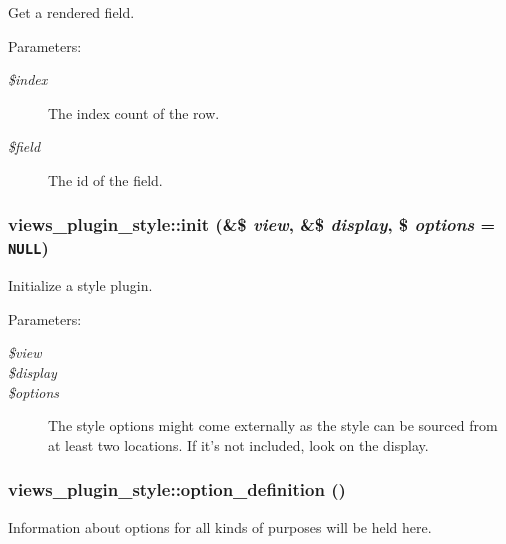Get a rendered field.

\begin{Desc}
\item[Parameters:]
\begin{description}
\item[{\em \$index}]The index count of the row. \item[{\em \$field}]The id of the field. \end{description}
\end{Desc}
\hypertarget{classviews__plugin__style_b48326b2ea3d9bd9ad5fdf4f544c8eed}{
\subsubsection[{init}]{\setlength{\rightskip}{0pt plus 5cm}views\_\-plugin\_\-style::init (\&\$ {\em view}, \/  \&\$ {\em display}, \/  \$ {\em options} = {\tt NULL})}}
\label{classviews__plugin__style_b48326b2ea3d9bd9ad5fdf4f544c8eed}


Initialize a style plugin.

\begin{Desc}
\item[Parameters:]
\begin{description}
\item[{\em \$view}]\item[{\em \$display}]\item[{\em \$options}]The style options might come externally as the style can be sourced from at least two locations. If it's not included, look on the display. \end{description}
\end{Desc}
\hypertarget{classviews__plugin__style_95b6f2eadf403ff36f1ff2860294b3c2}{
\subsubsection[{option\_\-definition}]{\setlength{\rightskip}{0pt plus 5cm}views\_\-plugin\_\-style::option\_\-definition ()}}
\label{classviews__plugin__style_95b6f2eadf403ff36f1ff2860294b3c2}


Information about options for all kinds of purposes will be held here. 

